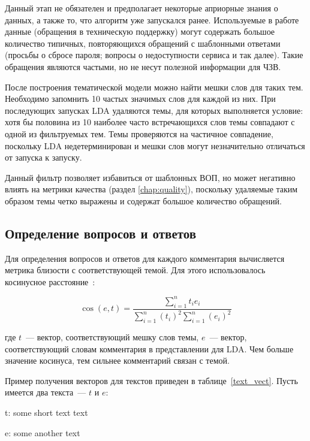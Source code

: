 Данный этап не обязателен и предполагает некоторые априорные знания о данных, а также то, что алгоритм уже запускался ранее. Используемые в работе данные (обращения в техническую поддержку) могут содержать большое количество типичных, повторяющихся обращений с шаблонными ответами (просьбы о сбросе пароля; вопросы о недоступности сервиса и так далее). Такие обращения являются частыми, но не несут полезной информации для ЧЗВ.

После построения тематической модели можно найти мешки слов для таких тем. Необходимо запомнить 10 частых значимых слов для каждой из них. При последующих запусках LDA удаляются темы, для которых выполняется условие: хотя бы половина из 10 наиболее часто встречающихся слов темы совпадают с одной из фильтруемых тем. Темы проверяются на частичное совпадение, поскольку LDA недетерминирован и мешки слов могут незначительно отличаться от запуска к запуску.

Данный фильтр позволяет избавиться от шаблонных ВОП, но может негативно влиять на метрики качества (раздел \ref{chap:quality}), поскольку удаляемые таким образом темы четко выражены и содержат большое количество обращений.

\subsection{Определение вопросов и ответов}
\label{subsec:findqa}

Для определения вопросов и ответов для каждого комментария вычисляется метрика близости с соответствующей темой. Для этого использовалось косинусное расстояние~\cite{cosine}: 

\begin{equation}\label{}
\cos(e, t)=\frac{\sum_{i=1}^nt_ie_i}{\sum_{i=1}^n(t_i)^2\sum_{i=1}^n(e_i)^2}
\end{equation}

\noindent
где $t$~--- вектор, соответствующий мешку слов темы, $e$~--- вектор, соответствующий словам комментария в представлении для LDA. Чем больше значение косинуса, тем сильнее комментарий связан с темой.

Пример получения векторов для текстов приведен в таблице~\ref{text_vect}. Пусть имеется два текста~--- $t$ и $e$:

\begin{itemize*}
\item t: some short text text
\item e: some another text
\end{itemize*}

